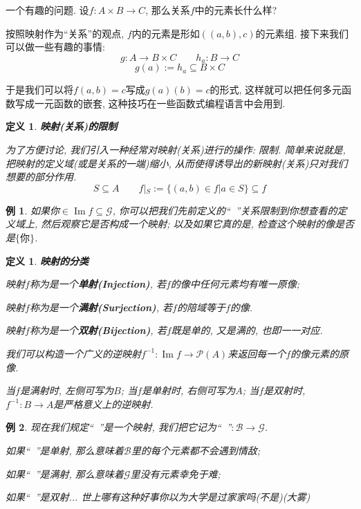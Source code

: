 \documentclass[UTF8]{ctexart}
\newcommand{\<}{\langle}
\renewcommand{\>}{\rangle}
\DeclareMathOperator{\Image}{Im}
\DeclareMathOperator{\like}{\overset{\heartsuit}{\leadsto}}
\DeclareMathOperator{\likes}{\overset{\heartsuit}{\rightarrow}}
\newtheorem{dfn}[thm]{定义}
\newtheorem{xmp}{例}[subsection]
\begin{document}
            一个有趣的问题. 设$f:A\times B\to C$, 那么关系$f$中的元素长什么样? 

            按照映射作为``关系''的观点, $f$内的元素是形如$((a,b),c)$的元素组. 接下来我们可以做一些有趣的事情: 
            \[g:A\to B\times C\qquad h_a:B\to C\]
            \[g(a):=h_a\subseteq B\times C\]

            于是我们可以将$f(a,b)=c$写成$g(a)(b)=c$的形式, 这样就可以把任何多元函数写成一元函数的嵌套, 这种技巧在一些函数式编程语言中会用到. 

            \begin{dfn}
                \textbf{映射(关系)的限制}

                为了方便讨论, 我们引入一种经常对映射(关系)进行的操作: 限制. 简单来说就是, 把映射的定义域(或是关系的一端)缩小, 从而使得诱导出的新映射(关系)只对我们想要的部分作用. 
                \[S\subseteq A\qquad f|_S:=\{(a,b)\in f|a\in S\}\subseteq f\]
            \end{dfn}
            
            \begin{xmp}
                如果你$\in\Image f\subseteq\mathcal{G}$, 你可以把我们先前定义的``$\like$''关系限制到你想查看的定义域上, 然后观察它是否构成一个映射; 以及如果它真的是, 检查这个映射的像是否是$\{\text{你}\}$. 
            \end{xmp}
            
            \begin{dfn}
                \textbf{映射的分类}

                映射$f$称为是一个\textbf{单射(Injection)}, 若$f$的像中任何元素均有唯一原像; 

                映射$f$称为是一个\textbf{满射(Surjection)}, 若$f$的陪域等于$f$的像. 

                映射$f$称为是一个\textbf{双射(Bijection)}, 若$f$既是单的, 又是满的, 也即一一对应. 

                我们可以构造一个广义的逆映射$f^{-1}:\Image f\to\mathcal{P}(A)$来返回每一个$f$的像元素的原像. 
                
                当$f$是满射时, 左侧可写为$B$; 当$f$是单射时, 右侧可写为$A$; 当$f$是双射时, $f^{-1}:B\to A$是严格意义上的逆映射. 
            \end{dfn}
            
            \begin{xmp}
                现在我们规定``$\like$''是一个映射, 我们把它记为``$\likes$''$:\mathcal{B}\to\mathcal{G}$. 
                
                如果``$\likes$''是单射, 那么意味着$\mathcal{B}$里的每个元素都不会遇到情敌; 

                如果``$\likes$''是满射, 那么意味着$\mathcal{G}$里没有元素幸免于难; 

                如果``$\likes$''是双射... 世上哪有这种好事你以为大学是过家家吗(不是)(大雾)
            \end{xmp}
\end{document}
